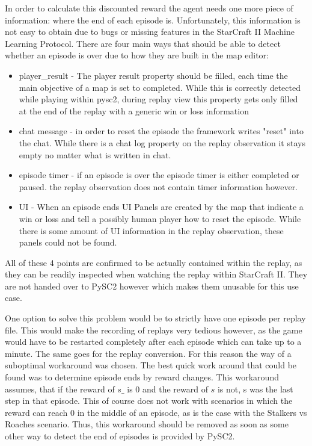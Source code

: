 In order to calculate this discounted reward the agent needs one more piece of information: where the end of each episode is. Unfortunately, this information is not easy to obtain due to bugs or missing features in the StarCraft II Machine Learning Protocol. There are four main ways that should be able to detect whether an episode is over due to how they are built in the map editor:

\begin{itemize}
\item player\_result - The player result property should be filled, each time the main objective of a map is set to completed. While this is correctly detected while playing within pysc2, during replay view this property gets only filled at the end of the replay with a generic win or loss information
\item chat message - in order to reset the episode the framework writes "reset" into the chat. While there is a chat log property on the replay observation it stays empty no matter what is written in chat.
\item episode timer - if an episode is over the episode timer is either completed or paused. the replay observation does not contain timer information however.
\item UI - When an episode ends UI Panels are created by the map that indicate a win or loss and tell a possibly human player how to reset the episode. While there is some amount of UI information in the replay observation, these panels could not be found.
\end{itemize}
All of these 4 points are confirmed to be actually contained within the replay, as they can be readily inspected when watching the replay within StarCraft II. They are not handed over to PySC2 however which makes them unusable for this use case.

One option to solve this problem would be to strictly have one episode per replay file. This would make the recording of replays very tedious however, as the game would have to be restarted completely after each episode which can take up to a minute. The same goes for the replay conversion. For this reason the way of a suboptimal workaround was chosen. The best quick work around that could be found was to determine episode ends by reward changes. This workaround assumes, that if the reward of $s\_$ is 0 and the reward of $s$ is not, s was the last step in that episode. This of course does not work with scenarios in which the reward can reach 0 in the middle of an episode, as is the case with the Stalkers vs Roaches scenario. Thus, this workaround should be removed as soon as some other way to detect the end of episodes is provided by PySC2.

